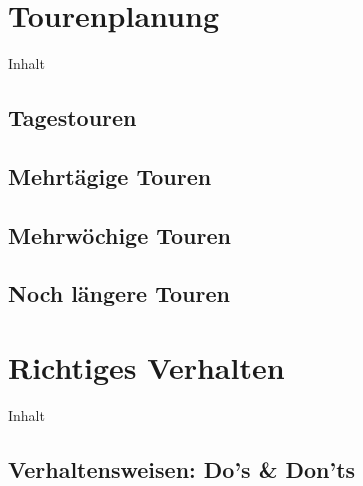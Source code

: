 \documentclass{beamer}
\begin{document}
	\section{Tourenplanung}
		
		\begin{frame}[t]{Inhalt}
		\end{frame}
	
		\subsection{Tagestouren}
			
			\begin{frame}{}
			\end{frame}
			
		\subsection{Mehrtägige Touren}
			
			\begin{frame}{}
			\end{frame}
		
		\subsection{Mehrwöchige Touren}
			
			\begin{frame}{}
			\end{frame}
		
		\subsection{Noch längere Touren}
			
			\begin{frame}{}
			\end{frame}
	
	\section{Richtiges Verhalten}
		
		\begin{frame}[t]{Inhalt}
		\end{frame}
		
		\subsection{Verhaltensweisen: Do's \& Don'ts}
			
\end{document}

